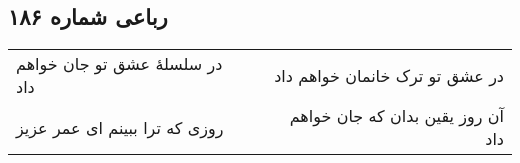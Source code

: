 \begin{center}
\section*{رباعی شماره ۱۸۶}
\label{sec:sh186}
\begin{longtable}{l p{0.5cm} r}
در سلسلهٔ عشق تو جان خواهم داد
&&
در عشق تو ترک خانمان خواهم داد
\\
روزی که ترا ببینم ای عمر عزیز
&&
آن روز یقین بدان که جان خواهم داد
\\
\end{longtable}
\end{center}
